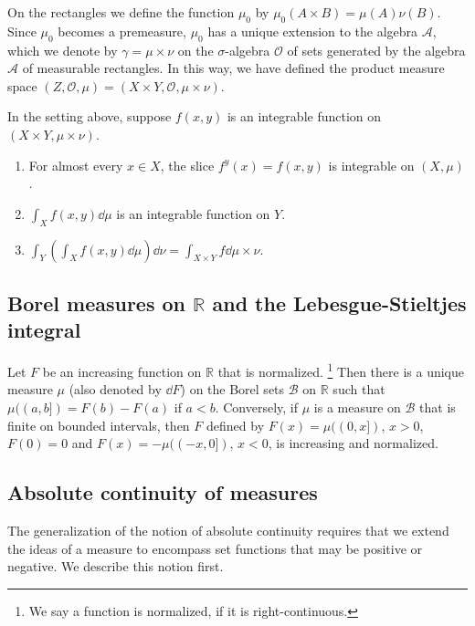 On the rectangles we define the function $\mu_0$ by $\mu_0(A\times B) = \mu(A)\nu(B)$.
Since $\mu_0$ becomes a premeasure, $\mu_0$ has a unique extension to the algebra $\mathcal A$,
which we denote by $\gamma=\mu\times\nu$ on the $\sigma$-algebra $\mathcal O$ of sets generated by the algebra $\mathcal A$ of measurable rectangles.
In this way, we have defined the product measure space $(Z,\mathcal O,\mu) = (X\times Y,\mathcal O,\mu\times\nu)$.

\begin{theorem}
  In the setting above, suppose $f(x,y)$ is an integrable function on $(X\times Y,\mu\times\nu)$.
  \begin{enumerate}
    \item For almost every $x\in X$, the slice $f^y(x) = f(x,y)$ is integrable on $(X,\mu)$.
    \item $\int_Xf(x,y)\dd\mu$ is an integrable function on $Y$.
    \item $\int_Y\left(\int_Xf(x,y)\dd\mu\right)\dd\nu = \int_{X\times Y}f\dd\mu\times\nu$.
  \end{enumerate}
\end{theorem}

\subsection{Borel measures on $\mathbb R$ and the Lebesgue-Stieltjes integral}

\begin{theorem}
  Let $F$ be an increasing function on $\mathbb R$ that is normalized.
  \footnote{We say a function is normalized, if it is right-continuous.}
  Then there is a unique measure $\mu$ (also denoted by $\dd F$) on the Borel sets $\mathcal B$ on $\mathbb R$
  such that $\mu((a,b]) = F(b) - F(a)$ if $a<b$.
  Conversely, if $\mu$ is a measure on $\mathcal B$ that is finite on bounded intervals,
  then $F$ defined by $F(x) = \mu((0,x])$, $x>0$, $F(0) = 0$ and $F(x) = -\mu((-x,0])$, $x<0$, 
  is increasing and normalized.
\end{theorem}

\subsection{Absolute continuity of measures}

The generalization of the notion of absolute continuity requires that we extend the ideas of a measure to encompass set functions that may be positive or negative. 
We describe this notion first.


